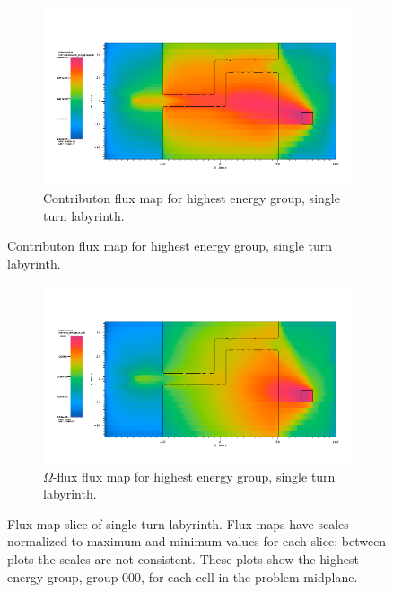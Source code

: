 \begin{figure}[htb!]\ContinuedFloat
  \centering
  \begin{subfigure}[t]{\textwidth}
    \includegraphics[width=0.9\linewidth]{./chapters/characterization_probs/figures/char/maze2/maze2McontribG00.png}
    \caption{Contributon flux map for highest energy group, single turn
    labyrinth.}
    \label{fig:maze2contrib}
  \end{subfigure}
\end{figure}
\begin{figure}[htb!]\ContinuedFloat
  \centering
  \begin{subfigure}[t]{\textwidth}
    \includegraphics[width=0.9\linewidth]{./chapters/characterization_probs/figures/char/maze2/maze2MomegaG00.png}
    \caption{$\Omega$-flux flux map for highest energy group, single turn
    labyrinth.}
    \label{fig:maze2omega}
  \end{subfigure}
  \caption[Flux map slice of single turn labyrinth.]{Flux map slice of single
  turn labyrinth. Flux maps have scales normalized to maximum and minimum values
  for each slice; between plots the scales are not consistent. These plots show
  the highest energy group, group 000, for each cell in the problem midplane.}
  \label{fig:maze2fluxmaps}
\end{figure}


